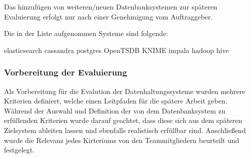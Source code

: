 Das hinzufügen von weiteren/neuen Datenbanksystemen zur späteren
Evaluierung erfolgt nur nach einer Genehmigung vom Auftraggeber.

Die in der Liste aufgenommen Systeme sind folgende:

\begin{outline}
  \1 elasticsearch
  \1 cassandra
  \1 postgres
  \1 OpenTSDB
  \1 KNIME
  \1 impala
  \1 hadoop
  \1 hive
\end{outline}
\nl%

\subsubsection{Vorbereitung der Evaluierung}
\label{subsubsec:DBS_vorbereitung_der_evaluierung}
Als Vorbereitung für die Evalution der Datenhaltungssysteme wurden mehrere
Kriterien definiert, welche einen Leitpfaden für die spätere Arbeit geben.
Während der Auswahl und Definition der von dem Datenbanksystem zu erfüllenden
Kriterien wurde darauf geachtet, dass diese sich aus dem späteren Zielsystem
ableiten lassen und ebenfalls realistisch erfüllbar sind. Anschließend wurde
die Relevanz jedes Kirteriums von den Teammitgliedern beurteilt und festgelegt.

